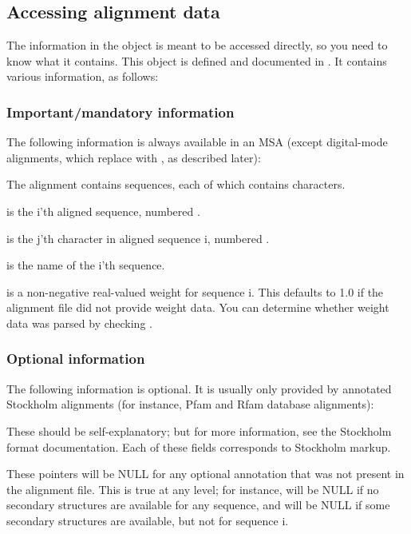 \subsection{Accessing alignment data}

The information in the  object is meant to be accessed
directly, so you need to know what it contains. This object is defined
and documented in . It contains various information,
as follows:

\subsubsection{Important/mandatory information}

The following information is always available in an MSA (except
digital-mode alignments, which replace  with
, as described later):



The alignment contains  sequences, each of which contains
 characters.

 is the i'th aligned sequence, numbered
. 

 is the j'th character in aligned sequence i,
numbered .

 is the name of the i'th sequence.

 is a non-negative real-valued weight for sequence
i. This defaults to 1.0 if the alignment file did not provide weight
data. You can determine whether weight data was parsed by checking
.



\subsubsection{Optional information}

The following information is optional. It is usually only provided by
annotated Stockholm alignments (for instance, Pfam and Rfam database
alignments):



These should be self-explanatory; but for more information, see the
Stockholm format documentation. Each of these fields corresponds to
Stockholm markup.

These pointers will be NULL for any optional annotation that was not
present in the alignment file. This is true at any level; for
instance,  will be NULL if no secondary structures are
available for any sequence, and  will be NULL if some
secondary structures are available, but not for sequence i.

